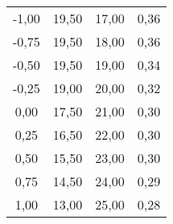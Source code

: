 \begin{table}[!htp]
\begin{tabular}{c c c c}
-1,00    & 19,50 &17,00    & 0,36 \\
-0,75    & 19,50 &18,00    & 0,36 \\
-0,50    & 19,50 &19,00    & 0,34 \\
-0,25    & 19,00 &20,00    & 0,32 \\
 0,00    & 17,50 &21,00    & 0,30 \\
 0,25    & 16,50 &22,00    & 0,30 \\
 0,50    & 15,50 &23,00    & 0,30 \\
 0,75    & 14,50 &24,00    & 0,29 \\
 1,00    & 13,00 &25,00    & 0,28 \\









\bottomrule
\end{tabular}
\end{table}